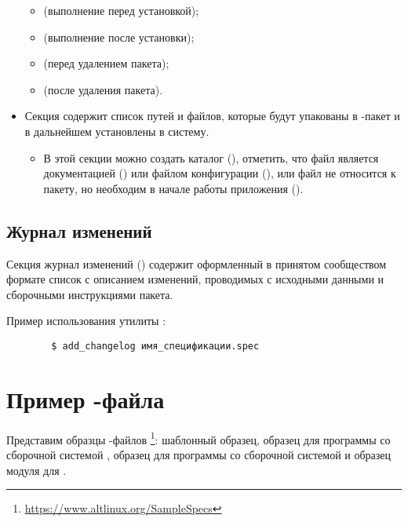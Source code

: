\begin{itemize}
\begin{itemize}
		\item {} (выполнение перед установкой);
		\item {} (выполнение после установки);
		\item {} (перед удалением пакета);
		\item {} (после удаления пакета).
	\end{itemize}
	\item Секция  содержит список путей и файлов, которые будут упакованы в -пакет
		и в дальнейшем установлены в систему.
	\begin{itemize}
		\item В этой секции можно создать каталог (), отметить, что файл является
			документацией () или файлом конфигурации (), или файл не
			относится к пакету, но необходим в начале работы приложения ().
	\end{itemize}
\end{itemize}


\subsection*{Журнал изменений}

Секция журнал изменений () содержит оформленный в принятом сообществом формате список
с описанием изменений, проводимых с исходными данными и сборочными инструкциями пакета.


Пример использования утилиты :
\begin{verbatim}
        $ add_changelog имя_спецификации.spec
\end{verbatim}

\section{Пример -файла}

Представим образцы -файлов%
\footnote{\href{https://www.altlinux.org/SampleSpecs}{https://www.altlinux.org/SampleSpecs}}: шаблонный образец,
образец для программы со сборочной системой , образец для программы со сборочной системой
 и образец модуля для .

